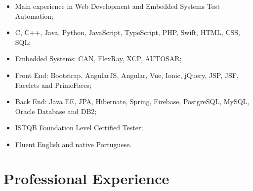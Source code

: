 \documentclass[10pt]{article}
\begin{document}
\begin{itemize}
	\item Main experience in Web Development and Embedded Systems Test Automation;
    \item C, C++, Java, Python, JavaScript, TypeScript, PHP, Swift, HTML, CSS, SQL;
    \item Embedded Systems: CAN, FlexRay, XCP, AUTOSAR;
    \item Front End: Bootstrap, AngularJS, Angular, Vue, Ionic, jQuery, JSP, JSF, Facelets and PrimeFaces;
    \item Back End: Java EE, JPA, Hibernate, Spring, Firebase, PostgreSQL, MySQL, Oracle Database and DB2;
    \item ISTQB Foundation Level Certified Tester;
    \item Fluent English and native Portuguese.
\end{itemize}


\section*{Professional Experience}
\end{document}
